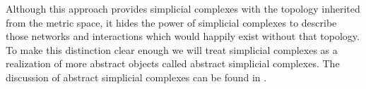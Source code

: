 \documentclass[../1.tex]{subfiles}
\begin{document}






    Although this approach provides simplicial complexes with the topology inherited from the metric space, it hides the power of simplicial complexes 
    to describe those networks and interactions which would happily exist without that topology. To make this distinction clear enough we will treat
    simplicial complexes as a realization of more abstract objects called abstract simplicial complexes. The discussion of abstract simplicial complexes
    can be found in \cite{rotman}.
    
\end{document}

